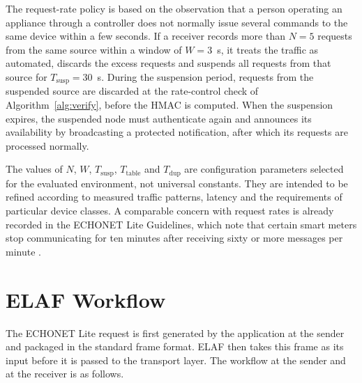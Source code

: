 The request-rate policy is based on the observation that a person operating an appliance through a controller does not normally issue several commands to the same device within a few seconds. If a receiver records more than $N = 5$ requests from the same source within a window of $W = 3$~s, it treats the traffic as automated, discards the excess requests and suspends all requests from that source for $T_{\mathrm{susp}} = 30$~s. During the suspension period, requests from the suspended source are discarded at the rate-control check of Algorithm~\ref{alg:verify}, before the HMAC is computed. When the suspension expires, the suspended node must authenticate again and announces its availability by broadcasting a protected notification, after which its requests are processed normally.

The values of $N$, $W$, $T_{\mathrm{susp}}$, $T_{\mathrm{table}}$ and $T_{\mathrm{dup}}$ are configuration parameters selected for the evaluated environment, not universal constants. They are intended to be refined according to measured traffic patterns, latency and the requirements of particular device classes. A comparable concern with request rates is already recorded in the ECHONET Lite Guidelines, which note that certain smart meters stop communicating for ten minutes after receiving sixty or more messages per minute \citep{ECHONETGuidelines}.

\section{ELAF Workflow}
\label{sec:m-workflow}

The ECHONET Lite request is first generated by the application at the sender and packaged in the standard frame format. ELAF then takes this frame as its input before it is passed to the transport layer. The workflow at the sender and at the receiver is as follows.

